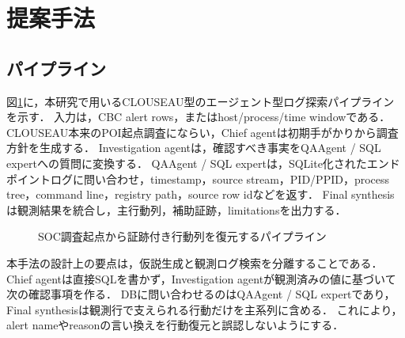 

\section{提案手法}

\subsection{パイプライン}

図\ref{figure:pipeline}に，本研究で用いるCLOUSEAU型のエージェント型ログ探索パイプラインを示す．
入力は，CBC alert rows，またはhost/process/time windowである．
CLOUSEAU本来のPOI起点調査\cite{clouseau}にならい，Chief agentは初期手がかりから調査方針を生成する．
Investigation agentは，確認すべき事実をQAAgent / SQL expertへの質問に変換する．
QAAgent / SQL expertは，SQLite化されたエンドポイントログに問い合わせ，timestamp，source stream，PID/PPID，process tree，command line，registry path，source row idなどを返す．
Final synthesisは観測結果を統合し，主行動列，補助証跡，limitationsを出力する．

\begin{figure}[ht]
    \centering
    \caption{SOC調査起点から証跡付き行動列を復元するパイプライン}
    \label{figure:pipeline}
\end{figure}

本手法の設計上の要点は，仮説生成と観測ログ検索を分離することである．
Chief agentは直接SQLを書かず，Investigation agentが観測済みの値に基づいて次の確認事項を作る．
DBに問い合わせるのはQAAgent / SQL expertであり，Final synthesisは観測行で支えられる行動だけを主系列に含める．
これにより，alert nameやreasonの言い換えを行動復元と誤認しないようにする．

